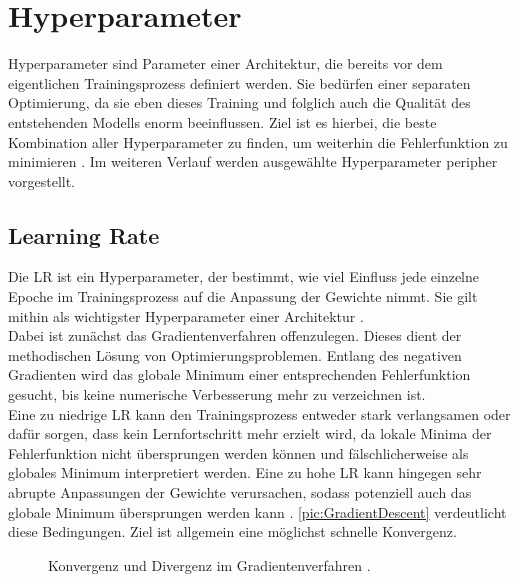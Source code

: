 \section{Hyperparameter}
\noindent
Hyperparameter sind Parameter einer Architektur, die bereits vor dem eigentlichen Trainingsprozess definiert werden. Sie bedürfen einer separaten Optimierung, da sie eben dieses Training und folglich auch die Qualität des entstehenden Modells enorm beeinflussen. Ziel ist es hierbei, die beste Kombination aller Hyperparameter zu finden, um weiterhin die Fehlerfunktion zu minimieren \cite[S.~1]{YAN20}. Im weiteren Verlauf werden ausgewählte Hyperparameter peripher vorgestellt.\\


\subsection{Learning Rate}
\noindent
Die \ac{LR} ist ein Hyperparameter, der bestimmt, wie viel Einfluss jede einzelne Epoche im Trainingsprozess auf die Anpassung der Gewichte nimmt. Sie gilt mithin als wichtigster Hyperparameter einer Architektur \cite[S.~428]{ZHA20}.\\

\noindent
Dabei ist zunächst das Gradientenverfahren offenzulegen. Dieses dient der methodischen Lösung von Optimierungsproblemen. Entlang des negativen Gradienten wird das globale Minimum einer entsprechenden Fehlerfunktion gesucht, bis keine numerische Verbesserung mehr zu verzeichnen ist.\\

\noindent
Eine zu niedrige \ac{LR} kann den Trainingsprozess entweder stark verlangsamen oder dafür sorgen, dass kein Lernfortschritt mehr erzielt wird, da lokale Minima der Fehlerfunktion nicht übersprungen werden können und fälschlicherweise als globales Minimum interpretiert werden. Eine zu hohe \ac{LR} kann hingegen sehr abrupte Anpassungen der Gewichte verursachen, sodass potenziell auch das globale Minimum übersprungen werden kann \cite[S.~414-415]{ZHA20}. \autoref{pic:GradientDescent} verdeutlicht diese Bedingungen. Ziel ist allgemein eine möglichst schnelle Konvergenz.

\begin{figure}[h!]
  \centering
  \caption{Konvergenz und Divergenz im Gradientenverfahren \cite[S.~429-430]{ZHA20}.}
  \label{pic:GradientDescent}
\end{figure}


